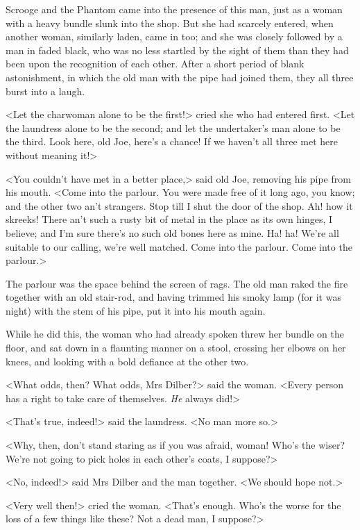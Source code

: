 Scrooge and the Phantom came into the presence of this man, just as a woman with
a heavy bundle slunk into the shop. But she had scarcely entered, when another
woman, similarly laden, came in too; and she was closely followed by a man in
faded black, who was no less startled by the sight of them than they had been
upon the recognition of each other. After a short period of blank astonishment,
in which the old man with the pipe had joined them, they all three burst into a
laugh.

<Let the charwoman alone to be the first!> cried she who had en\-tered first.
<Let the laundress alone to be the second; and let the undertaker's man alone to
be the third. Look here, old Joe, here's a chance! If we haven't all three met
here without meaning it!>

<You couldn't have met in a better place,> said old Joe, removing his pipe from
his mouth. <Come into the parlour. You were made free of it long ago, you know;
and the other two an't strangers. Stop till I shut the door of the shop. Ah! how
it skreeks! There an't such a rusty bit of metal in the place as its own hinges,
I believe; and I'm sure there's no such old bones here as mine. Ha! ha! We're
all suitable to our calling, we're well matched. Come into the parlour. Come
into the parlour.>

The parlour was the space behind the screen of rags. The old man raked the fire
together with an old stair-rod, and having trimmed his smoky lamp (for it was
night) with the stem of his pipe, put it into his mouth again.

While he did this, the woman who had already spoken threw her bundle on the
floor, and sat down in a flaunting manner on a stool, crossing her elbows on her
knees, and looking with a bold defiance at the other two.

<What odds, then? What odds, Mrs Dilber?> said the woman. <Every person has a
right to take care of themselves. \emph{He} always did!>

<That's true, indeed!> said the laundress. <No man more so.>

<Why, then, don't stand staring as if you was afraid, woman! Who's the wiser?
We're not going to pick holes in each other's coats, I suppose?>

<No, indeed!> said Mrs Dilber and the man together. <We should hope not.>

<Very well then!> cried the woman. <That's enough. Who's the worse for the loss
of a few things like these? Not a dead man, I suppose?>

